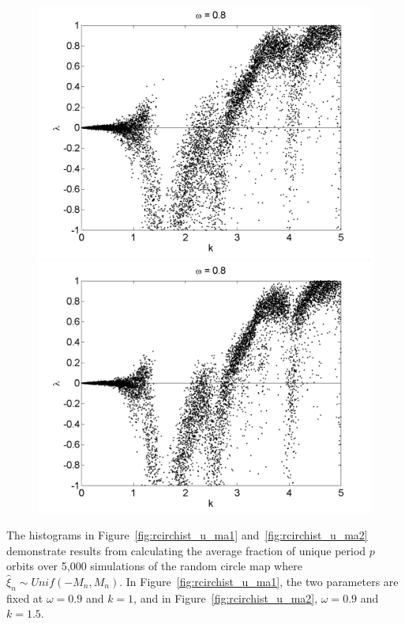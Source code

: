 \begin{figure}[!h]
\includegraphics[width=.5\textwidth]{figs/rcirc_u_lyap_10000_L_05_w_08_k.png}\hfill
\includegraphics[width=.5\textwidth]{figs/rcirc_u_lyap_10000_L_07_w_08_k.png}\\
\end{figure}

The histograms in Figure~\ref{fig:rcirchist_u_ma1}
and~\ref{fig:rcirchist_u_ma2} demonstrate results from calculating the
average fraction of unique period $p$ orbits over 5,000 simulations of
the random circle map where $\hat{\xi}_n\sim Unif(-M_n,M_n)$. In
Figure~\ref{fig:rcirchist_u_ma1}, the two parameters are fixed at $\omega=0.9$
and $k=1$, and in Figure~\ref{fig:rcirchist_u_ma2}, $\omega = 0.9$ and
$k=1.5$. 

